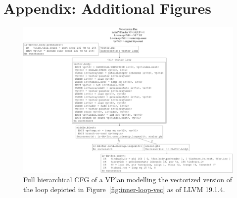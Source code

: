 \documentclass[sigplan,11pt,nonacm]{acmart}
\begin{document}



\appendix

\section{Appendix: Additional Figures}\label{appendix-figures}

\begin{figure}
  \centering
  \includegraphics[width=\textwidth]{images/inner-loop-vplan-hcfg.png}
  \caption{Full hierarchical CFG of a VPlan modelling the vectorized version of the loop 
  depicted in Figure~\ref{fig:inner-loop-vec} as of LLVM 19.1.4.}
  \label{fig:inner-loop-vplan-hcfg}
\end{figure}
\end{document}
